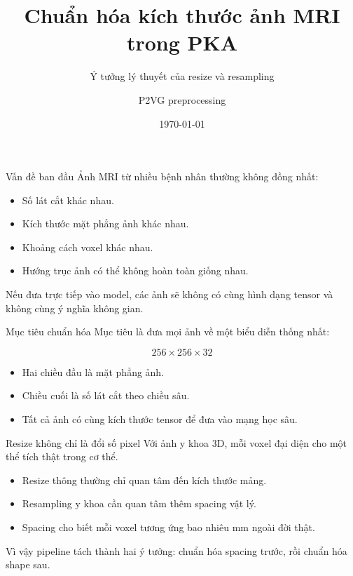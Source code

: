 \documentclass[aspectratio=169]{beamer}
\title{Chuẩn hóa kích thước ảnh MRI trong PKA}
\subtitle{Ý tưởng lý thuyết của resize và resampling}
\author{P2VG preprocessing}
\date{\today}
\begin{document}
\begin{frame}
  \titlepage
\end{frame}

\begin{frame}{Vấn đề ban đầu}
  Ảnh MRI từ nhiều bệnh nhân thường không đồng nhất:

  \begin{itemize}
    \item Số lát cắt khác nhau.
    \item Kích thước mặt phẳng ảnh khác nhau.
    \item Khoảng cách voxel khác nhau.
    \item Hướng trục ảnh có thể không hoàn toàn giống nhau.
  \end{itemize}

  \vspace{0.3cm}
  Nếu đưa trực tiếp vào model, các ảnh sẽ không có cùng hình dạng tensor và không cùng ý nghĩa không gian.
\end{frame}

\begin{frame}{Mục tiêu chuẩn hóa}
  Mục tiêu là đưa mọi ảnh về một biểu diễn thống nhất:

  \[
    256 \times 256 \times 32
  \]

  \begin{itemize}
    \item Hai chiều đầu là mặt phẳng ảnh.
    \item Chiều cuối là số lát cắt theo chiều sâu.
    \item Tất cả ảnh có cùng kích thước tensor để đưa vào mạng học sâu.
  \end{itemize}
\end{frame}

\begin{frame}{Resize không chỉ là đổi số pixel}
  Với ảnh y khoa 3D, mỗi voxel đại diện cho một thể tích thật trong cơ thể.

  \begin{itemize}
    \item Resize thông thường chỉ quan tâm đến kích thước mảng.
    \item Resampling y khoa cần quan tâm thêm spacing vật lý.
    \item Spacing cho biết mỗi voxel tương ứng bao nhiêu mm ngoài đời thật.
  \end{itemize}

  \vspace{0.3cm}
  Vì vậy pipeline tách thành hai ý tưởng: chuẩn hóa spacing trước, rồi chuẩn hóa shape sau.
\end{frame}
\end{document}
